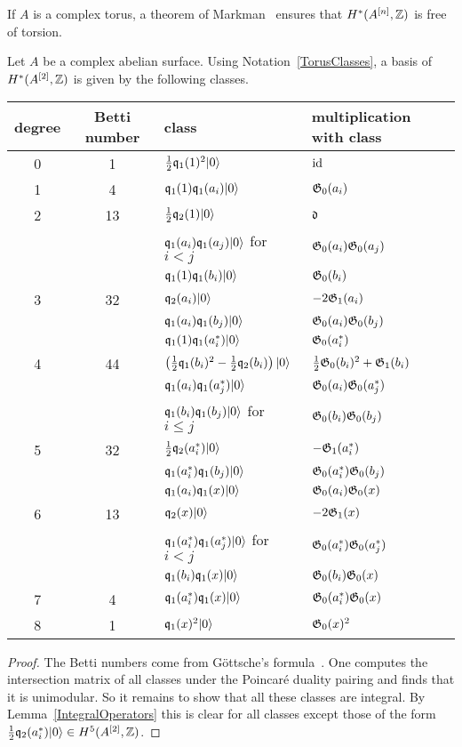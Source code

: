 \begin{remark}
If $A$ is a complex torus, a theorem of Markman~\cite{Markman} ensures that $H^*(A^{[n]},\mathbb{Z})$ is free of torsion.
\end{remark} 

\begin{proposition} \label{A2Basis}
Let $A$ be a complex abelian surface. Using Notation~\ref{TorusClasses}, a basis of $H^*(A^{[2]},\mathbb{Z})$ is given by the following classes.
\begin{center}
\begin{tabular}{c|c|l|l}
 degree & Betti number & class & multiplication with class \\\hline
 0 & 1 & $\frac{1}{2}\mathfrak{q}_1(1)^2|0\rangle$ & $\operatorname{id}$ \\ \hline
 1 & 4 &  $\mathfrak{q}_1(1)\mathfrak{q}_1(a_i)|0\rangle$ & $\mathfrak{G}_0(a_i)$ \\ \hline
 2 & 13 & $\frac{1}{2}\mathfrak{q}_2(1)|0\rangle$ & $\mathfrak{d}$ \\ 
   &  & $\mathfrak{q}_1(a_i)\mathfrak{q}_1(a_j)|0\rangle$ for $i<j$ & $\mathfrak{G}_0(a_i)\mathfrak{G}_0(a_j)$ \\
   &  & $\mathfrak{q}_1(1)\mathfrak{q}_1(b_i)|0\rangle$ & $\mathfrak{G}_0(b_i)$ \\\hline
 3 & 32 & $\mathfrak{q}_2(a_i)|0\rangle$  & $-2\mathfrak{G}_1(a_i) $ \\
   &  & $\mathfrak{q}_1(a_i)\mathfrak{q}_1(b_j)|0\rangle$ & $\mathfrak{G}_0(a_i)\mathfrak{G}_0(b_j)$ \\ 
   &  & $\mathfrak{q}_1(1)\mathfrak{q}_1(a^*_i)|0\rangle$ & $\mathfrak{G}_0(a^*_i)$ \\\hline
 4 & 44 & $\left(\frac{1}{2}\mathfrak{q}_1(b_i)^2-\frac{1}{2}\mathfrak{q}_2(b_i)\right)|0\rangle$ & $\frac{1}{2} \mathfrak{G}_0(b_i)^2 + \mathfrak{G}_1(b_i) $ \\
   &  & $\mathfrak{q}_1(a_i)\mathfrak{q}_1(a^*_j)|0\rangle$ & $\mathfrak{G}_0(a_i)\mathfrak{G}_0(a^*_j)$ \\
   &  & $ \mathfrak{q}_1(b_i)\mathfrak{q}_1(b_j)|0\rangle$ for $i\leq j$ &  $\mathfrak{G}_0(b_i)\mathfrak{G}_0(b_j)$ \\\hline
 5 & 32 & $\frac{1}{2}\mathfrak{q}_2(a^*_i)|0\rangle$ & $-\mathfrak{G}_1(a^*_i)$ \\
   &  & $\mathfrak{q}_1(a^*_i)\mathfrak{q}_1(b_j)|0\rangle$ & $ \mathfrak{G}_0(a^*_i)\mathfrak{G}_0(b_j)$ \\
   &  & $\mathfrak{q}_1(a_i)\mathfrak{q}_1(x)|0\rangle$ & $\mathfrak{G}_0(a_i)\mathfrak{G}_0(x)$ \\\hline
 6 & 13 & $\mathfrak{q}_2(x)|0\rangle$ & $-2\mathfrak{G}_1(x)$ \\
   &  & $\mathfrak{q}_1(a^*_i)\mathfrak{q}_1(a^*_j)|0\rangle$ for $i<j$ & $\mathfrak{G}_0(a^*_i)\mathfrak{G}_0(a^*_j)$ \\
   &  & $\mathfrak{q}_1(b_i)\mathfrak{q}_1(x)|0\rangle$ & $ \mathfrak{G}_0(b_i)\mathfrak{G}_0(x)$ \\\hline
 7 & 4 & $\mathfrak{q}_1(a^*_i)\mathfrak{q}_1(x)|0\rangle$ & $\mathfrak{G}_0(a^*_i)\mathfrak{G}_0(x) $ \\\hline
 8 & 1 & $\mathfrak{q}_1(x)^2|0\rangle$ & $\mathfrak{G}_0(x)^2$ 
\end{tabular}
\end{center}
\begin{proof}
The Betti numbers come from G\"ottsche's formula~\cite{Gottsche}.
One computes the intersection matrix of all classes under the Poincar\'e duality pairing and finds that it is unimodular. 
So it remains to show that all these classes are integral. By Lemma~\ref{IntegralOperators} this is clear for all classes except 
those of the form $\frac{1}{2}\mathfrak{q}_2(a^*_i)|0\rangle \in H^5(A^{[2]},\mathbb{Z})$.


\end{proof}
\end{proposition}
